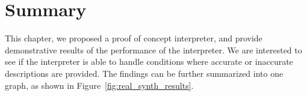 

\section{Summary}
This chapter, we proposed a proof of concept interpreter, and provide demonstrative results of the performance of the interpreter. We are interested to see if the interpreter is able to handle conditions where accurate or inaccurate descriptions are provided. The findings can be further summarized into one graph, as shown in Figure~\ref{fig:real_synth_results}.
